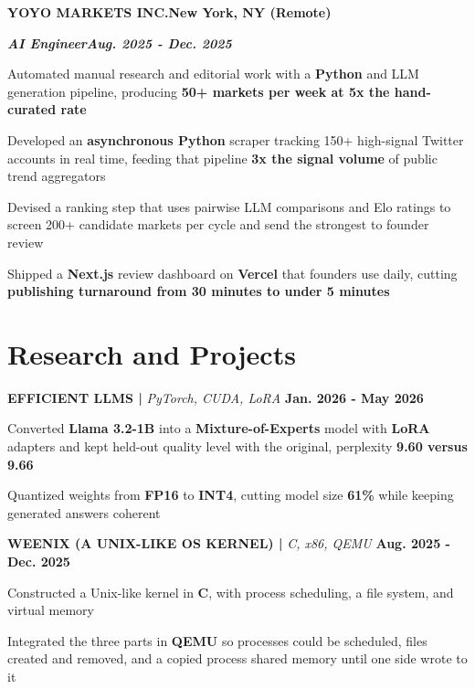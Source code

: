 \documentclass[10pt]{article}
\newcommand{\job}[4]{%
  \vspace{0pt}%
  \textbf{\MakeUppercase{#1}}\hfill\textbf{#2}\par
  \vspace{0.5pt}%
  \textbf{\textit{#3}}\hfill\textbf{\textit{#4}}\par
}
\newcommand{\proj}[4]{%
  \vspace{3pt}%
  \textbf{\MakeUppercase{#1} | }\textit{#2}\hfill
  \textbf{#4}%
  \notblank{#3}{\ \textbf{| #3}}{}%
  \par
}
\begin{document}
\vspace{3pt}
\job{Yoyo Markets Inc.}{New York, NY (Remote)}{AI Engineer}{Aug. 2025 - Dec. 2025}
\begin{bullets}
  \item Automated manual research and editorial work with a \textbf{Python} and LLM generation pipeline, producing \textbf{50+ markets per week at 5x the hand-curated rate}
  \item Developed an \textbf{asynchronous Python} scraper tracking 150+ high-signal Twitter accounts in real time, feeding that pipeline \textbf{3x the signal volume} of public trend aggregators
  \item Devised a ranking step that uses pairwise LLM comparisons and Elo ratings to screen 200+ candidate markets per cycle and send the strongest to founder review
  \item Shipped a \textbf{Next.js} review dashboard on \textbf{Vercel} that founders use daily, cutting \textbf{publishing turnaround from 30 minutes to under 5 minutes}
\end{bullets}

\section{Research and Projects}
\vspace{-3pt}
\proj{Efficient LLMs}{PyTorch, CUDA, LoRA}{USC}{Jan. 2026 - May 2026}
\begin{bullets}
  \item Converted \textbf{Llama 3.2-1B} into a \textbf{Mixture-of-Experts} model with \textbf{LoRA} adapters and kept held-out quality level with the original, perplexity \textbf{9.60 versus 9.66}
  \item Quantized weights from \textbf{FP16} to \textbf{INT4}, cutting model size \textbf{61\%} while keeping generated answers coherent
\end{bullets}

\proj{Weenix (A Unix-Like OS Kernel)}{C, x86, QEMU}{USC}{Aug. 2025 - Dec. 2025}
\begin{bullets}
  \item Constructed a Unix-like kernel in \textbf{C}, with process scheduling, a file system, and virtual memory
  \item Integrated the three parts in \textbf{QEMU} so processes could be scheduled, files created and removed, and a copied process shared memory until one side wrote to it
\end{bullets}
\end{document}
